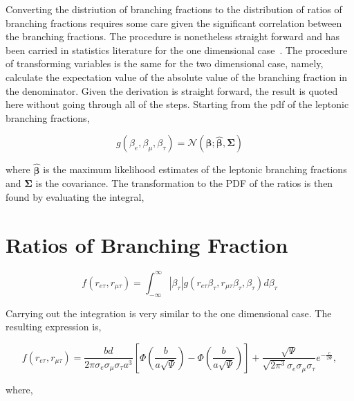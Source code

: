
Converting the distriution of branching fractions to the distribution of
ratios of branching fractions requires some care given the significant
correlation between the branching fractions.  The procedure is
nonetheless straight forward and has been carried in statistics
literature for the one dimensional case~\cite{10.1093/biomet/24.3-4.428,
10.2307/2334671}.  The procedure of transforming variables is the same
for the two dimensional case, namely, calculate the expectation value of
the absolute value of the branching fraction in the denominator.  Given
the derivation is straight forward, the result is quoted here without
going through all of the steps.  Starting from the pdf of the leptonic
branching fractions,

\begin{equation}
    g(\beta_{e}, \beta_{\mu}, \beta_{\tau}) =
    \mathcal{N}\left(\boldsymbol{\beta}; \hat{\boldsymbol{\beta}}, \boldsymbol{\Sigma}\right)
\end{equation}

where $\hat{\boldsymbol{\beta}}$ is the maximum likelihood estimates of the
leptonic branching fractions and $\boldsymbol{\Sigma}$ is the covariance.
The transformation to the PDF of the ratios is then found by evaluating
the integral,


\section{Ratios of Branching Fraction}

\begin{equation}
    f(r_{e\tau}, r_{\mu\tau}) = \int_{-\infty}^{\infty}
    \left| \beta_{\tau}\right|g(r_{e\tau}\beta_{\tau}, r_{\mu\tau}\beta_{\tau}, \beta_{\tau})
    d\beta_{\tau}
\end{equation}

Carrying out the integration is very similar to the one dimensional
case.  The resulting expression is,

\begin{equation}
    f(r_{e\tau}, r_{\mu\tau}) 
    = \frac{bd}{2\pi \sigma_{e}\sigma_{\mu}\sigma_{\tau} a^{3}}
        \left[ \Phi \left(\frac{b}{a\sqrt{\Psi}}\right)
         - \Phi\left(\frac{b}{a\sqrt{\Psi}}\right)\right] 
         +
         \frac{\sqrt{\Psi}}{\sqrt{2\pi^{3}}\sigma_{e}\sigma_{\mu}\sigma_{\tau}}e^{-\frac{c}{2\Psi}},
\end{equation}

where,

